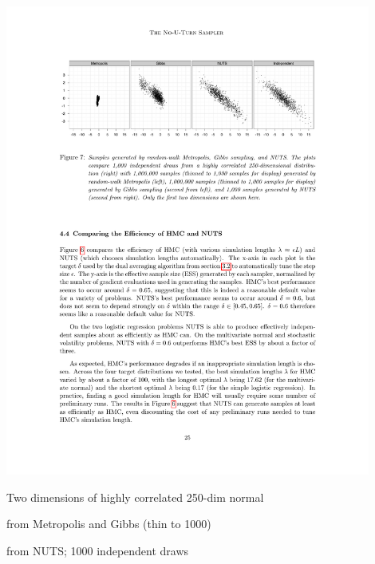 \documentclass[10pt]{report}
\begin{document}
%
\includegraphics[width=0.9\textwidth]{img/nuts-vs.pdf}
\begin{subitemize}
\item Two dimensions of highly correlated 250-dim normal
\item {} from Metropolis and Gibbs (thin to 1000)
\item {} from NUTS; 1000 independent draws
\end{subitemize}


\end{document}
